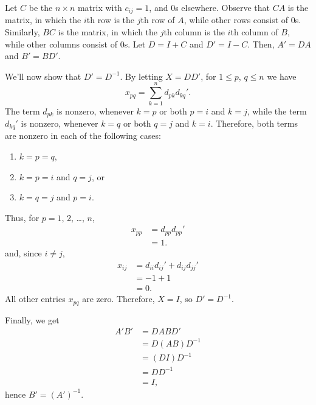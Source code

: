 Let $C$ be the $n\times n$ matrix with $c_{ij}=1$, and 0s elsewhere.
Observe that $CA$ is the matrix, in which the $i$th row is the $j$th row of $A$, while other rows consist of 0s.
Similarly, $BC$ is the matrix, in which the $j$th column is the $i$th column of $B$, while other columns consist of 0s.
Let $D=I+C$ and $D'=I-C$.
Then, $A'=DA$ and $B'=BD'$.

We'll now show that $D'=D^{-1}$.
By letting $X=DD'$, for $1\le p$, $q\le n$ we have
\[
    x_{pq} = \sum_{k=1}^nd_{pk}d_{kq}'.
\]
The term $d_{pk}$ is nonzero, whenever $k=p$ or both $p=i$ and $k=j$, while the term $d_{kq}'$ is nonzero, whenever $k=q$ or both $q=j$ and $k=i$.
Therefore, both terms are nonzero in each of the following cases:
\begin{enumerate}
    \item $k=p=q$,
    \item $k=p=i$ and $q=j$, or
    \item $k=q=j$ and $p=i$.
\end{enumerate}
Thus, for $p=1$, 2, \dots, $n$,
\begin{align*}
    x_{pp} &= d_{pp}d_{pp}' \\
    &= 1.
\end{align*}
and, since $i\ne j$,
\begin{align*}
    x_{ij} &= d_{ii}d_{ij}'+d_{ij}d_{jj}' \\
    &= -1+1 \\
    &= 0.
\end{align*}
All other entries $x_{pq}$ are zero.
Therefore, $X=I$, so $D'=D^{-1}$.

Finally, we get
\begin{align*}
    A'B' &= DABD' \\
    &= D(AB)D^{-1} \\
    &= (DI)D^{-1} \\
    &= DD^{-1} \\
    &= I,
\end{align*}
hence $B'=(A')^{-1}$.
